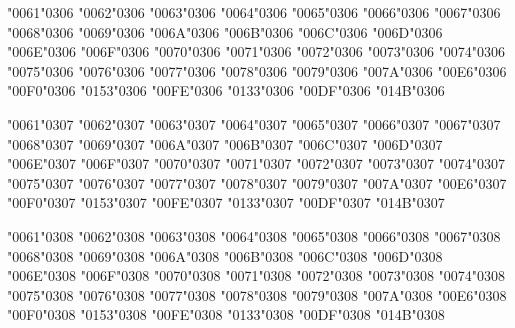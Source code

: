 {\textsc{\char"0061\char"0306} \textsc{\char"0062\char"0306} \textsc{\char"0063\char"0306} \textsc{\char"0064\char"0306} \textsc{\char"0065\char"0306} \textsc{\char"0066\char"0306} \textsc{\char"0067\char"0306} \textsc{\char"0068\char"0306} \textsc{\char"0069\char"0306} \textsc{\char"006A\char"0306} \textsc{\char"006B\char"0306} \textsc{\char"006C\char"0306} \textsc{\char"006D\char"0306} \textsc{\char"006E\char"0306} \textsc{\char"006F\char"0306} \textsc{\char"0070\char"0306} \textsc{\char"0071\char"0306} \textsc{\char"0072\char"0306} \textsc{\char"0073\char"0306} \textsc{\char"0074\char"0306} \textsc{\char"0075\char"0306} \textsc{\char"0076\char"0306} \textsc{\char"0077\char"0306} \textsc{\char"0078\char"0306} \textsc{\char"0079\char"0306} \textsc{\char"007A\char"0306} \textsc{\char"00E6\char"0306} \textsc{\char"00F0\char"0306} \textsc{\char"0153\char"0306} \textsc{\char"00FE\char"0306} \textsc{\char"0133\char"0306} \textsc{\char"00DF\char"0306} \textsc{\char"014B\char"0306}

\textsc{\char"0061\char"0307} \textsc{\char"0062\char"0307} \textsc{\char"0063\char"0307} \textsc{\char"0064\char"0307} \textsc{\char"0065\char"0307} \textsc{\char"0066\char"0307} \textsc{\char"0067\char"0307} \textsc{\char"0068\char"0307} \textsc{\char"0069\char"0307} \textsc{\char"006A\char"0307} \textsc{\char"006B\char"0307} \textsc{\char"006C\char"0307} \textsc{\char"006D\char"0307} \textsc{\char"006E\char"0307} \textsc{\char"006F\char"0307} \textsc{\char"0070\char"0307} \textsc{\char"0071\char"0307} \textsc{\char"0072\char"0307} \textsc{\char"0073\char"0307} \textsc{\char"0074\char"0307} \textsc{\char"0075\char"0307} \textsc{\char"0076\char"0307} \textsc{\char"0077\char"0307} \textsc{\char"0078\char"0307} \textsc{\char"0079\char"0307} \textsc{\char"007A\char"0307} \textsc{\char"00E6\char"0307} \textsc{\char"00F0\char"0307} \textsc{\char"0153\char"0307} \textsc{\char"00FE\char"0307} \textsc{\char"0133\char"0307} \textsc{\char"00DF\char"0307} \textsc{\char"014B\char"0307}

\textsc{\char"0061\char"0308} \textsc{\char"0062\char"0308} \textsc{\char"0063\char"0308} \textsc{\char"0064\char"0308} \textsc{\char"0065\char"0308} \textsc{\char"0066\char"0308} \textsc{\char"0067\char"0308} \textsc{\char"0068\char"0308} \textsc{\char"0069\char"0308} \textsc{\char"006A\char"0308} \textsc{\char"006B\char"0308} \textsc{\char"006C\char"0308} \textsc{\char"006D\char"0308} \textsc{\char"006E\char"0308} \textsc{\char"006F\char"0308} \textsc{\char"0070\char"0308} \textsc{\char"0071\char"0308} \textsc{\char"0072\char"0308} \textsc{\char"0073\char"0308} \textsc{\char"0074\char"0308} \textsc{\char"0075\char"0308} \textsc{\char"0076\char"0308} \textsc{\char"0077\char"0308} \textsc{\char"0078\char"0308} \textsc{\char"0079\char"0308} \textsc{\char"007A\char"0308} \textsc{\char"00E6\char"0308} \textsc{\char"00F0\char"0308} \textsc{\char"0153\char"0308} \textsc{\char"00FE\char"0308} \textsc{\char"0133\char"0308} \textsc{\char"00DF\char"0308} \textsc{\char"014B\char"0308}

}
